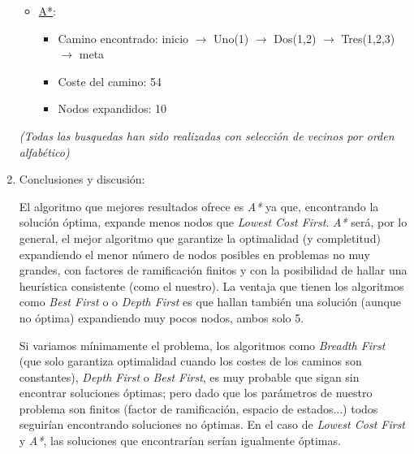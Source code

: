 \documentclass{article}
\begin{document}
\begin{enumerate}
\begin{itemize}
            \item \underline{A*}:
                \begin{itemize}
                    \item Camino encontrado: inicio $\rightarrow$ Uno(1) $\rightarrow$ Dos(1,2) $\rightarrow$ Tres(1,2,3) $\rightarrow$ meta
                    \item Coste del camino: 54
                    \item Nodos expandidos: 10
                \end{itemize}           
        \end{itemize}
        \bigskip
        \textit{(Todas las busquedas han sido realizadas con selección de vecinos por orden alfabético)}

    \item
        Conclusiones y discusión:

        \setlength{\parindent}{2ex}
        El algoritmo que mejores resultados ofrece es \textit{A*} ya que, encontrando la solución óptima, expande menos nodos que \textit{Lowest Cost First}.
        \textit{A*} será, por lo general, el mejor algoritmo que garantize la optimalidad (y completitud) expandiendo el menor número de 
        nodos posibles en problemas no muy grandes, con factores de ramificación finitos y con la posibilidad de hallar una heurística consistente (como el nuestro).
        La ventaja que tienen los algoritmos como \textit{Best First} o o \textit{Depth First} es que hallan también una solución (aunque no óptima)
        expandiendo muy pocos nodos, ambos solo 5.

        Si variamos mínimamente el problema, los algoritmos como \textit{Breadth First} (que solo garantiza optimalidad cuando los costes de los caminos
        son constantes), \textit{Depth First} o \textit{Best First}, es muy probable que sigan sin encontrar soluciones óptimas; pero dado que los parámetros de nuestro problema
        son finitos (factor de ramificación, espacio de estados...) todos seguirían encontrando soluciones no óptimas. En el caso de \textit{Lowest Cost First} y
        \textit{A*}, las soluciones que encontrarían serían igualmente óptimas.
\end{enumerate}
\end{document}
